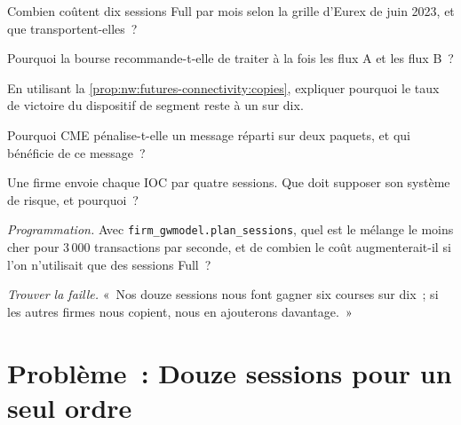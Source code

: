 \begin{exercise}[$\star$]\label{exo:nw:futures-connectivity:2}
Combien coûtent dix sessions Full par mois selon la grille d'Eurex de juin 2023, et que transportent-elles~?
\end{exercise}

\begin{exercise}[$\star$]\label{exo:nw:futures-connectivity:3}
Pourquoi la bourse recommande-t-elle de traiter à la fois les flux A et les flux B~?
\end{exercise}

\begin{exercise}[$\star\star$]\label{exo:nw:futures-connectivity:4}
En utilisant la \cref{prop:nw:futures-connectivity:copies}, expliquer pourquoi le taux de victoire du dispositif de segment reste à un sur dix.
\end{exercise}

\begin{exercise}[$\star\star$]\label{exo:nw:futures-connectivity:5}
Pourquoi CME pénalise-t-elle un message réparti sur deux paquets, et qui bénéficie de ce message~?
\end{exercise}

\begin{exercise}[$\star\star$]\label{exo:nw:futures-connectivity:6}
Une firme envoie chaque IOC par quatre sessions. Que doit supposer son système de risque, et pourquoi~?
\end{exercise}

\begin{exercise}[$\star\star\star$]\label{exo:nw:futures-connectivity:7}
\emph{Programmation.} Avec \texttt{firm\_gwmodel.plan\_sessions}, quel est le mélange le moins cher pour 3\,000 transactions par seconde, et
de combien le coût augmenterait-il si l'on n'utilisait que des sessions Full~?
\end{exercise}

\begin{exercise}[$\star\star\star$]\label{exo:nw:futures-connectivity:8}
\emph{Trouver la faille.} «~Nos douze sessions nous font gagner six courses sur dix~; si les autres firmes nous copient, nous en ajouterons davantage.~»
\end{exercise}

\section{Problème~: Douze sessions pour un seul ordre}

